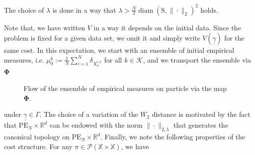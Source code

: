 \documentclass[11pt]{article}
\newcommand{\RR}{\mathbb{R}}
\newcommand{\XX}{\mathbb{X}}
\newcommand{\cK}{\mathcal{K}}
\newcommand{\cP}{\mathcal{P}}
\begin{document}
\begin{assume}\label{assume:lambda}
    The choice of $\lambda$ is done in a way that $\lambda > \frac{N}{2}\operatorname{diam}(\mathrm{S}, \|\cdot\|_2)^2$ holds.
\end{assume}

Note that, we have written $V$ in a way it depends on the initial data. Since the problem is fixed for a given data set, we omit it and simply write $V(\underline{\gamma})$ for the same cost. In this expectation, we start with an ensemble of initial empirical measures, i.e. $\mu_0^k := \frac{1}{N}\sum_{i=1}^N\delta_{X_0^{i,k}}$ for all $k\in\cK$, and we transport the ensemble via $\bm{\Phi}$

\begin{figure}[H]
\centering
{}

\caption{Flow of the ensemble of empirical measures on particle via the map $\bm{\Phi}$.}
\label{fig:phi-bold-map}
\end{figure}
under $\underline{\gamma}\in\Gamma$. The choice of a variation of the $W_2$ distance is motivated by the fact that $\mathrm{PE}_N\times\RR^d$ can be endowed with the norm $\|\cdot\|_{2,\lambda}$ that generates the canonical topology on $\mathrm{PE}_N\times\RR^d$. Finally, we note the following properties of the cost structure. For any $\pi\in\cP(\XX\times\XX)$, we have
\end{document}
